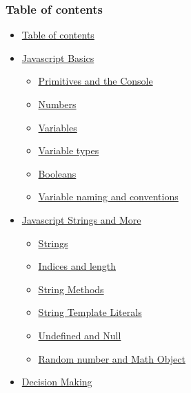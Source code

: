 \documentclass[
  paper=a4,
  ,captions=tableheading
]{scrartcl}
\author{}
\date{}
\title{}
\author{}
\date{}
\providecommand{\tightlist}{%
  \setlength{\itemsep}{0pt}\setlength{\parskip}{0pt}}
\begin{document}




{
\setcounter{tocdepth}{3}
\tableofcontents
}
\hypertarget{table-of-contents}{%
\subsubsection{Table of contents}\label{table-of-contents}}

\begin{itemize}
\tightlist
\item
  \protect\hyperlink{table-of-contents}{Table of contents}
\item
  \protect\hyperlink{javascript-basics}{Javascript Basics}

  \begin{itemize}
  \tightlist
  \item
    \protect\hyperlink{primitives-and-the-console}{Primitives and the
    Console}
  \item
    \protect\hyperlink{numbers}{Numbers}
  \item
    \protect\hyperlink{variables}{Variables}
  \item
    \protect\hyperlink{variable-types}{Variable types}
  \item
    \protect\hyperlink{booleans}{Booleans}
  \item
    \protect\hyperlink{variable-naming-and-conventions}{Variable naming
    and conventions}
  \end{itemize}
\item
  \protect\hyperlink{javascript-strings-and-more}{Javascript Strings and
  More}

  \begin{itemize}
  \tightlist
  \item
    \protect\hyperlink{strings}{Strings}
  \item
    \protect\hyperlink{indices-and-length}{Indices and length}
  \item
    \protect\hyperlink{string-methods}{String Methods}
  \item
    \protect\hyperlink{string-template-literals}{String Template
    Literals}
  \item
    \protect\hyperlink{undefined-and-null}{Undefined and Null}
  \item
    \protect\hyperlink{random-number-and-math-object}{Random number and
    Math Object}
  \end{itemize}
\item
  \protect\hyperlink{decision-making}{Decision Making}


\end{itemize}
\end{document}
